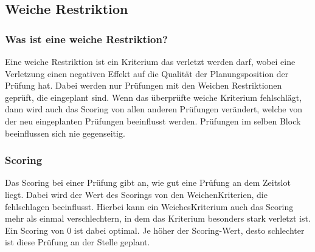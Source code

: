 \subsection{Weiche Restriktion}\label{subsec:weiche_restriktion}

\subsubsection{Was ist eine weiche Restriktion?}
Eine weiche Restriktion ist ein Kriterium das verletzt werden darf, wobei eine Verletzung einen negativen
Effekt auf die Qualität der Planungsposition der Prüfung hat.
Dabei werden nur Prüfungen mit den Weichen Restriktionen geprüft, die eingeplant sind.
Wenn das überprüfte weiche Kriterium fehlschlägt, dann wird auch das Scoring von allen anderen Prüfungen
verändert, welche von der neu eingeplanten Prüfungen beeinflusst werden.
Prüfungen im selben Block beeinflussen sich nie gegenseitig.

\subsubsection{Scoring}
Das Scoring bei einer Prüfung gibt an, wie gut eine Prüfung an dem Zeitslot liegt.
Dabei wird der Wert des Scorings von den WeichenKriterien, die fehlschlagen beeinflusst.
Hierbei kann ein WeichesKriterium auch das Scoring mehr als einmal verschlechtern, in dem das Kriterium
besonders stark verletzt ist.
Ein Scoring von 0 ist dabei optimal.
Je höher der Scoring-Wert, desto schlechter ist diese Prüfung an der Stelle geplant.











